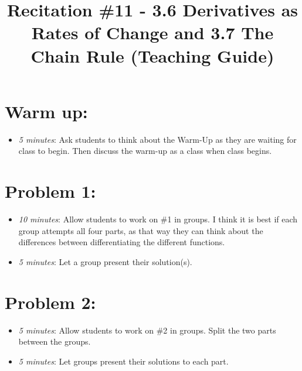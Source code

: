 \documentclass[handout,nooutcomes]{ximera}
\title{Recitation \#11 - 3.6 Derivatives as Rates of Change and 3.7 The Chain Rule (Teaching Guide)}
\begin{document}
\begin{abstract}		\end{abstract}
\maketitle


\section*{Warm up:} 
	
	\begin{itemize}
	
	\item  \emph{5 minutes}:  Ask students to think about the Warm-Up as they are waiting for class to begin.  Then discuss the warm-up as a class when class begins.
	
	
	
	\end{itemize}


\section*{Problem 1:}

	\begin{itemize}
	
	\item  \emph{10 minutes}:  Allow students to work on \#1 in groups.  I think it is best if each group attempts all four parts, as that way they can think about the differences between differentiating the different functions.
	
	\item  \emph{5 minutes}:  Let a group present their solution(s).
	
	\end{itemize}



\section*{Problem 2:}

	\begin{itemize}
	
	\item  \emph{5 minutes}:  Allow students to work on \#2 in groups.  Split the two parts between the groups.
		
	\item  \emph{5 minutes}:  Let groups present their solutions to each part.
			
	\end{itemize}
	
\end{document}
